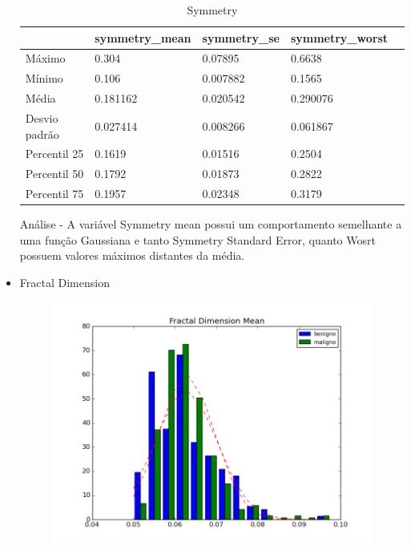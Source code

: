 \documentclass[11pt,a4paper]{article}
\numberwithin{equation}{section}
\begin{document}
\begin{itemize}
\begin{table}[H]
\centering
\caption{Symmetry}
\label{my-label}
\begin{tabular}{lllll} \hline
              & symmetry\_mean & symmetry\_se & symmetry\_worst &  \\ \hline
Máximo        & 0.304          & 0.07895      & 0.6638          &  \\
Mínimo        & 0.106          & 0.007882     & 0.1565          &  \\
Média         & 0.181162       & 0.020542     & 0.290076        &  \\
Desvio padrão & 0.027414       & 0.008266     & 0.061867        &  \\
Percentil 25  & 0.1619         & 0.01516      & 0.2504          &  \\
Percentil 50  & 0.1792         & 0.01873      & 0.2822          &  \\
Percentil 75  & 0.1957         & 0.02348      & 0.3179          &  \\ \hline
\end{tabular}
\end{table}

Análise - A variável Symmetry mean possui um comportamento semelhante  a uma função Gaussiana e tanto Symmetry Standard Error, quanto Wosrt possuem valores máximos distantes da média.

\item Fractal Dimension
\begin{figure}[H]
\centering
  \includegraphics[width=.5\linewidth]{../img/hist/fractal_dimension_mean}
  \label{fig:test1}
\end{figure}%


\end{itemize}
\end{document}
